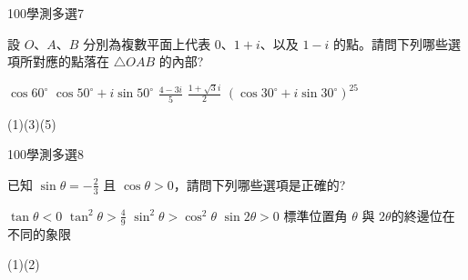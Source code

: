     \begin{QUESTION}
        \begin{ExamInfo}{100}{學測}{多選}{7}
        \end{ExamInfo}
        \begin{ExamAnsRateInfo}{40}{73}{32}{15}
        \end{ExamAnsRateInfo}
        \begin{QBODY}
            設 $O$、$A$、$B$ 分別為複數平面上代表 $0$、$1+i$、以及 $1-i$ 的點。請問下列哪些選項所對應的點落在 $\triangle OAB$ 的內部?
			\begin{QOPS} 
				\QOP $\cos 60^\circ$    
				\QOP $\cos 50^\circ +i \sin 50^\circ$    \QOP $\frac{4-3i}{5}$    
				\QOP $\frac{1+\sqrt{3}i}{2}$  
				\QOP $(\cos30^\circ +i\sin 30^\circ) ^{25}$
			\end{QOPS}
        \end{QBODY}
        \begin{QFROMS}
        \end{QFROMS}
        \begin{QTAGS}\end{QTAGS}
        \begin{QANS}
            (1)(3)(5)
        \end{QANS}
        \begin{QSOLLIST}
        \end{QSOLLIST}
        \begin{QEMPTYSPACE}
        \end{QEMPTYSPACE}
    \end{QUESTION}
    \begin{QUESTION}
        \begin{ExamInfo}{100}{學測}{多選}{8}
        \end{ExamInfo}
        \begin{ExamAnsRateInfo}{54}{82}{55}{25}
        \end{ExamAnsRateInfo}
        \begin{QBODY}
            已知 $\sin \theta = -\frac{2}{3}$ 且 $\cos\theta >0$，請問下列哪些選項是正確的? 
			\begin{QOPS} 
				\QOP $\tan \theta < 0$  
				\QOP $\tan^2\theta > \frac{4}{9}$ 
				\QOP $ \sin^2 \theta > \cos^2 \theta$ 
				\QOP $\sin 2\theta>0$ 
				\QOP 標準位置角 $\theta$ 與 $2\theta$的終邊位在不同的象限
			\end{QOPS}
        \end{QBODY}
        \begin{QFROMS}
        \end{QFROMS}
        \begin{QTAGS}\end{QTAGS}
        \begin{QANS}
            (1)(2)
        \end{QANS}
        \begin{QSOLLIST}
        \end{QSOLLIST}
        \begin{QEMPTYSPACE}
        \end{QEMPTYSPACE}
    \end{QUESTION}
